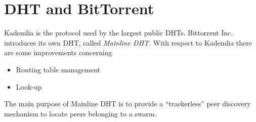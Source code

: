 \section{DHT and BitTorrent}
Kademlia is the protocol used by the largest public DHTs.
Bittorrent Inc. introduces its own DHT, called \textit{Mainline DHT}.
With respect to Kademlia there are some improvements concerning 
\begin{itemize}
   \item Routing table management
   \item Look-up
\end{itemize}

The main purpose of Mainline DHT is to provide a “trackerless” peer discovery mechanism to locate peers belonging to a swarm.